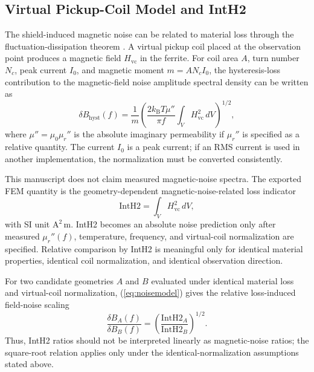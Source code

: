 \documentclass[letterpaper,journal]{IEEEtran}
\begin{document}
\subsection{Virtual Pickup-Coil Model and IntH2}

The shield-induced magnetic noise can be related to material loss through the fluctuation-dissipation theorem \cite{ref9,ref18}. A virtual pickup coil placed at the observation point produces a magnetic field $H_{\mathrm{vc}}$ in the ferrite. For coil area $A$, turn number $N_c$, peak current $I_0$, and magnetic moment $m=AN_cI_0$, the hysteresis-loss contribution to the magnetic-field noise amplitude spectral density can be written as
\begin{equation}
\delta B_{\mathrm{hyst}}(f)=
\frac{1}{m}
\left(
\frac{2k_{\mathrm{B}}T\mu''}{\pi f}
\int_V H_{\mathrm{vc}}^2\,dV
\right)^{1/2},
\label{eq:noisemodel}
\end{equation}
where $\mu''=\mu_0\mu_r''$ is the absolute imaginary permeability if $\mu_r''$ is specified as a relative quantity. The current $I_0$ is a peak current; if an RMS current is used in another implementation, the normalization must be converted consistently.

This manuscript does not claim measured magnetic-noise spectra. The exported FEM quantity is the geometry-dependent magnetic-noise-related loss indicator
\begin{equation}
\mathrm{IntH2}=\int_V H_{\mathrm{vc}}^2\,dV,
\label{eq:inth2}
\end{equation}
with SI unit $\mathrm{A^2\,m}$. IntH2 becomes an absolute noise prediction only after measured $\mu_r''(f)$, temperature, frequency, and virtual-coil normalization are specified. Relative comparison by IntH2 is meaningful only for identical material properties, identical coil normalization, and identical observation direction.

For two candidate geometries $A$ and $B$ evaluated under identical material loss and virtual-coil normalization, (\ref{eq:noisemodel}) gives the relative loss-induced field-noise scaling
\begin{equation}
\frac{\delta B_A(f)}{\delta B_B(f)}
=
\left(
\frac{\mathrm{IntH2}_A}{\mathrm{IntH2}_B}
\right)^{1/2}.
\label{eq:relnoise}
\end{equation}
Thus, IntH2 ratios should not be interpreted linearly as magnetic-noise ratios; the square-root relation applies only under the identical-normalization assumptions stated above.
\end{document}
